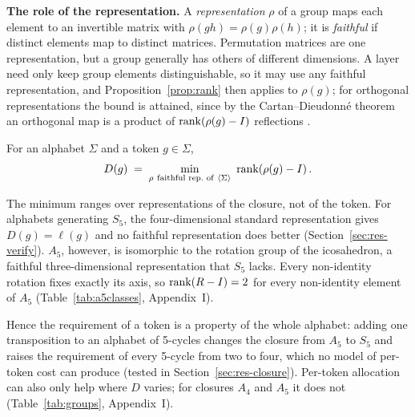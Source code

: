 \textbf{The role of the representation.} A \emph{representation} $\rho$ of a group maps each element to an invertible matrix with $\rho(gh) = \rho(g)\rho(h)$; it is \emph{faithful} if distinct elements map to distinct matrices. Permutation matrices are one representation, but a group generally has others of different dimensions. A layer need only keep group elements distinguishable, so it may use any faithful representation, and Proposition~\ref{prop:rank} then applies to $\rho(g)$; for orthogonal representations the bound is attained, since by the Cartan--Dieudonn\'e theorem an orthogonal map is a product of $\operatorname{rank}(\rho(g) - I)$ reflections \cite{geometricalgebra}.

\begin{definition}
\label{def:demand}
For an alphabet $\Sigma$ and a token $g \in \Sigma$,
\begin{equation}
D(g) \;=\; \min_{\rho\ \text{faithful rep.\ of}\ \gen{\Sigma}} \ \rank\!\left(\rho(g) - I\right).
\label{eq:demand}
\end{equation}
\end{definition}

The minimum ranges over representations of the closure, not of the token. For alphabets generating $S_5$, the four-dimensional standard representation gives $D(g) = \ell(g)$ and no faithful representation does better (Section~\ref{sec:res-verify}). $A_5$, however, is isomorphic to the rotation group of the icosahedron, a faithful three-dimensional representation that $S_5$ lacks. Every non-identity rotation fixes exactly its axis, so $\operatorname{rank}(R - I) = 2$ for every non-identity element of $A_5$ (Table~\ref{tab:a5classes}, Appendix~I).


Hence the requirement of a token is a property of the whole alphabet: adding one transposition to an alphabet of 5-cycles changes the closure from $A_5$ to $S_5$ and raises the requirement of every 5-cycle from two to four, which no model of per-token cost can produce (tested in Section~\ref{sec:res-closure}). Per-token allocation can also only help where $D$ varies; for closures $A_4$ and $A_5$ it does not (Table~\ref{tab:groups}, Appendix~I).

